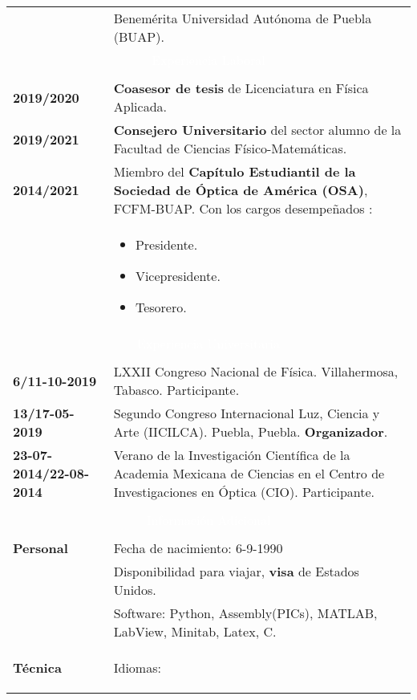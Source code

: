 \documentclass[twoside,letter,openright,10pt]{report}
\begin{document}
\begin{table}[hbt!]
\begin{tabular}{p{40mm}p{140mm}}
& Benemérita Universidad Autónoma de Puebla (BUAP). 
\\
\multicolumn{2}{c}{\cellcolor{black} \textcolor{white}{Experiencia Laboral}}
\\
\\
\textbf{2019/2020} & \textbf{Coasesor de tesis} de Licenciatura en Física Aplicada.
\\
\textbf{2019/2021} & \textbf{Consejero Universitario} del sector alumno de la Facultad de Ciencias Físico-Matemáticas.
\\
\textbf{2014/2021} & Miembro del \textbf{Capítulo Estudiantil de la Sociedad de Óptica de América (OSA)}, FCFM-BUAP. Con los cargos desempeñados :\\
& \vspace{-2mm} \begin{itemize}[noitemsep,nolistsep]
\item Presidente.
\item Vicepresidente.
\item Tesorero.
\vspace{-4mm}
\end{itemize}
\\
\multicolumn{2}{c}{\cellcolor{black} \textcolor{white}{Experiencia Universitaria}}
\\
\\
\textbf{6/11-10-2019} &LXXII Congreso Nacional de Física. Villahermosa, Tabasco. Participante.
\\
\textbf{13/17-05-2019} &Segundo Congreso Internacional Luz, Ciencia y Arte (IICILCA). Puebla, Puebla. \textbf{Organizador}.
\\
\textbf{23-07-2014/22-08-2014} & Verano de la Investigación Científica de la Academia Mexicana de Ciencias en el Centro de Investigaciones en Óptica (CIO). Participante.
\\
\\
\multicolumn{2}{c}{\cellcolor{black} \textcolor{white}{Información Adicional}}
\\
\\
\textbf{Personal} &  Fecha de nacimiento: 6-9-1990
\\
& Disponibilidad para viajar, \textbf{visa} de Estados Unidos.
\\
& Software: Python, Assembly(PICs), MATLAB, LabView, Minitab, Latex, C.
\\
\textbf{Técnica}
& Idiomas:
\begin{itemize}

\end{itemize}
\end{tabular}
\end{table}
\end{document}
